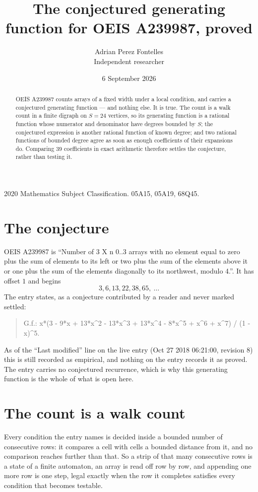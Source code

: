 \documentclass[11pt,a4paper]{article}
\title{The conjectured generating function for OEIS A239987, proved}
\author{Adrian Perez Fontelles\\ \small Independent researcher}
\date{6 September 2026}
\theoremstyle{plain}
\theoremstyle{definition}
\begin{document}
\maketitle

\begin{abstract}
OEIS A239987 counts arrays of a fixed width under a local condition, and carries a conjectured
generating function --- and nothing else. It is true. The count is a walk count in a finite
digraph on $S=24$ vertices, so its generating function is a rational function whose numerator
and denominator have degrees bounded by $S$; the conjectured expression is another rational
function of known degree; and two rational functions of bounded degree agree as soon as enough
coefficients of their expansions do. Comparing $39$ coefficients in exact arithmetic
therefore settles the conjecture, rather than testing it.
\end{abstract}

\noindent\small 2020 Mathematics Subject Classification. 05A15, 05A19, 68Q45.\normalsize

\section{The conjecture}

OEIS A239987 is ``Number of 3 X n 0..3 arrays with no element equal to zero plus the sum of elements to its left or two plus the sum of the elements above it or one plus the sum of the elements diagonally to its northwest, modulo 4.''. It has offset $1$ and begins
\[
3, 6, 13, 22, 38, 65,\ \dots
\]
The entry states, as a conjecture contributed by a reader and never marked settled:
\begin{quote}
G.f.: x*(3 - 9*x + 13*x\^{}2 - 13*x\^{}3 + 13*x\^{}4 - 8*x\^{}5 + x\^{}6 + x\^{}7) / (1 - x)\^{}5.
\end{quote}
As of the ``Last modified'' line on the live entry (Oct 27 2018 06:21:00, revision 8) this is still
recorded as empirical, and nothing on the entry records it as proved. The entry carries no
conjectured recurrence, which is why this generating function is the whole of what is open
here.

\section{The count is a walk count}

Every condition the entry names is decided inside a bounded number of consecutive rows: it
compares a cell with cells a bounded distance from it, and no comparison reaches further than
that. So a strip of that many consecutive rows is a state of a finite automaton, an array is
read off row by row, and appending one more row is one step, legal exactly when the row it
completes satisfies every condition that becomes testable.
\end{document}

